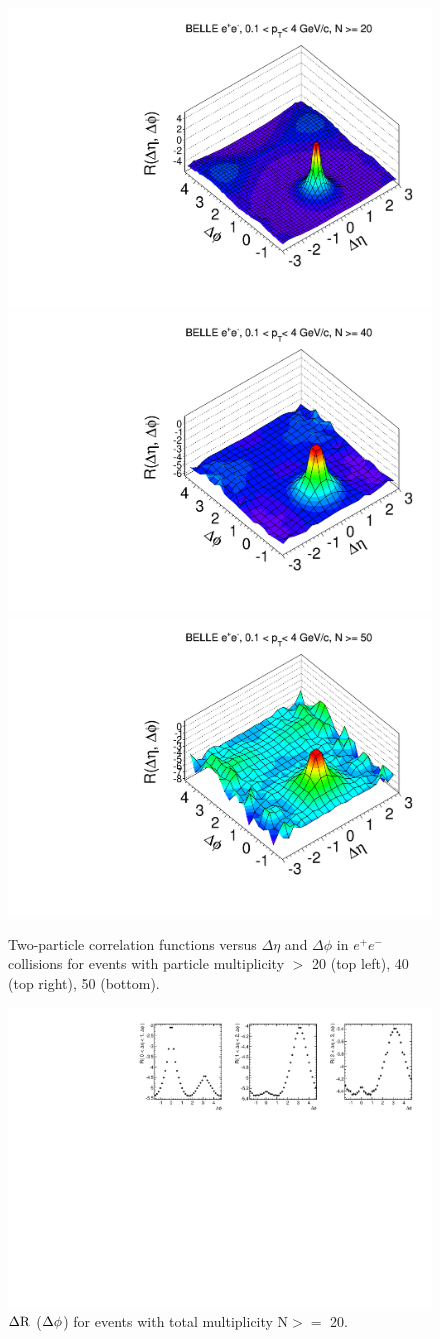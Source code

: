 \documentclass[%
preprint,
 amsmath,amssymb,
 aps,
]{revtex4-1}
\begin{document}
\begin{figure}[!htb]
\begin{center}
\includegraphics[width=.45\textwidth]{figures/canvasRidgeBelleMult20CutHigh0.pdf}
\includegraphics[width=.45\textwidth]{figures/canvasRidgeBelleMult40CutHigh0.pdf}
\includegraphics[width=.45\textwidth]{figures/canvasRidgeBelleMult50CutHigh0.pdf}
\caption{Two-particle correlation functions versus $\Delta\eta$ and $\Delta\phi$ in $e^{+}e^{-}$ collisions for events with particle multiplicity $>$ 20 (top left), 40 (top right), 50 (bottom).}
\label{fig:ridgeBelle} 
\end{center}
\end{figure}


\begin{figure}[!htb]
\begin{center}
\includegraphics[width=.95\textwidth]{figures/canvasProjection_isBelle1_mult20.pdf}
\caption{$\rm \Delta R$ ($\rm \Delta\phi$) for events with total multiplicity N$>=$ 20. }
\label{fig:ProjectionMult20} 
\end{center}
\end{figure}
\end{document}
